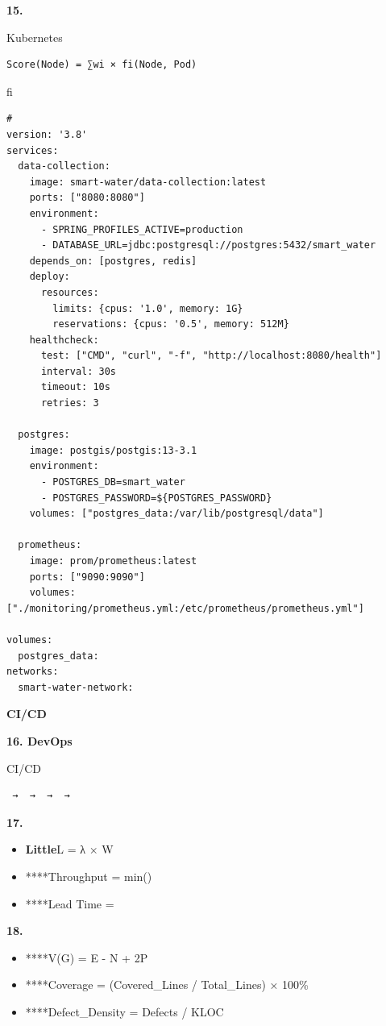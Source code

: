\textbf{15. }

Kubernetes

\begin{verbatim}
Score(Node) = ∑wi × fi(Node, Pod)
\end{verbatim}

fi

\begin{verbatim}
# 
version: '3.8'
services:
  data-collection:
    image: smart-water/data-collection:latest
    ports: ["8080:8080"]
    environment:
      - SPRING_PROFILES_ACTIVE=production
      - DATABASE_URL=jdbc:postgresql://postgres:5432/smart_water
    depends_on: [postgres, redis]
    deploy:
      resources:
        limits: {cpus: '1.0', memory: 1G}
        reservations: {cpus: '0.5', memory: 512M}
    healthcheck:
      test: ["CMD", "curl", "-f", "http://localhost:8080/health"]
      interval: 30s
      timeout: 10s
      retries: 3
  
  postgres:
    image: postgis/postgis:13-3.1
    environment:
      - POSTGRES_DB=smart_water
      - POSTGRES_PASSWORD=${POSTGRES_PASSWORD}
    volumes: ["postgres_data:/var/lib/postgresql/data"]
    
  prometheus:
    image: prom/prometheus:latest
    ports: ["9090:9090"]
    volumes: ["./monitoring/prometheus.yml:/etc/prometheus/prometheus.yml"]
    
volumes:
  postgres_data:
networks:
  smart-water-network:
\end{verbatim}

\textbf{CI/CD}

\textbf{16. DevOps}

CI/CD

\begin{verbatim}
 →  →  →  → 
\end{verbatim}

\textbf{17. }

\begin{itemize}
\tightlist
\item
  \textbf{Little}L = λ × W
\item
  ****Throughput = min()
\item
  ****Lead Time =
\end{itemize}

\textbf{18. }

\begin{itemize}
\tightlist
\item
  ****V(G) = E - N + 2P
\item
  ****Coverage = (Covered\_Lines / Total\_Lines) × 100\%
\item
  ****Defect\_Density = Defects / KLOC
\end{itemize}

